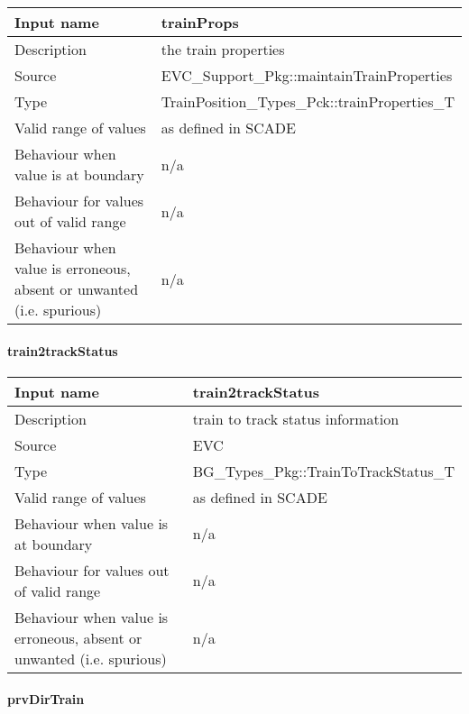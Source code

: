 \begin{longtable}{p{}p{}}
\toprule
Input name				& trainProps \\
\midrule
Description				& the train properties \\
\midrule
Source					& EVC\_Support\_Pkg::maintainTrainProperties \\ 
\midrule
Type					& TrainPosition\_Types\_Pck::trainProperties\_T \\
\midrule
Valid range of values	& as defined in SCADE \\
\midrule
Behaviour when value is at boundary	& n/a \\
\midrule
Behaviour for values out of valid range	& n/a \\
\midrule
Behaviour when value is erroneous, absent or unwanted (i.e. spurious) & n/a \\
\bottomrule
\end{longtable}

\paragraph{train2trackStatus}

\begin{longtable}{p{}p{}}
\toprule
Input name				& train2trackStatus \\
\midrule
Description				& train to track status information \\
\midrule
Source					& EVC \\ 
\midrule
Type					& BG\_Types\_Pkg::TrainToTrackStatus\_T \\
\midrule
Valid range of values	& as defined in SCADE \\
\midrule
Behaviour when value is at boundary	& n/a \\
\midrule
Behaviour for values out of valid range	& n/a \\
\midrule
Behaviour when value is erroneous, absent or unwanted (i.e. spurious) & n/a \\
\bottomrule
\end{longtable}

\paragraph{prvDirTrain}

